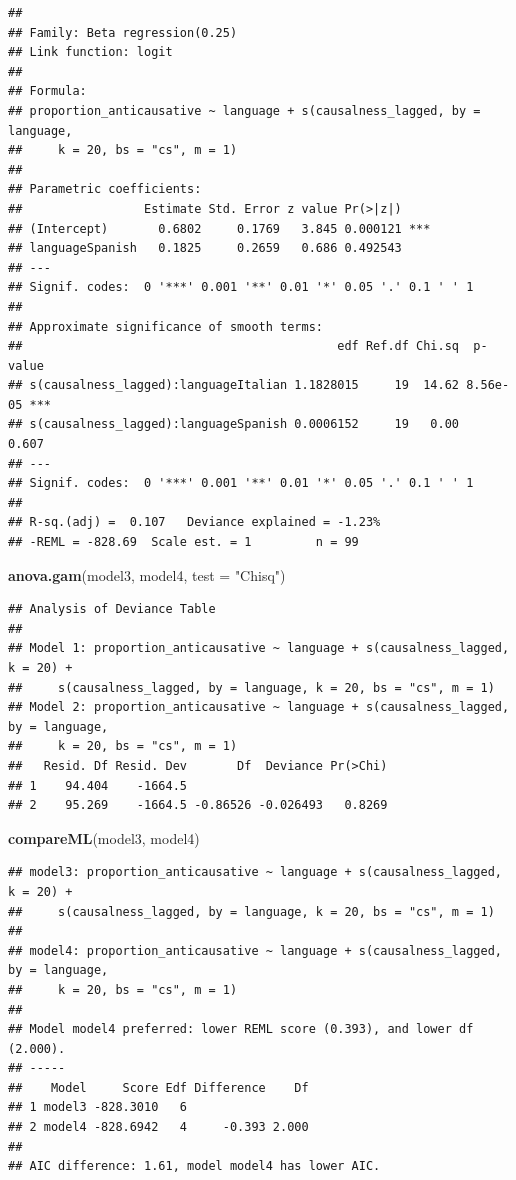 \documentclass[
]{article}
\newenvironment{Shaded}{\begin{snugshade}}{\end{snugshade}}
\newcommand{\AttributeTok}[1]{\textcolor[rgb]{0.13,0.29,0.53}{#1}}
\newcommand{\FunctionTok}[1]{\textcolor[rgb]{0.13,0.29,0.53}{\textbf{#1}}}
\newcommand{\NormalTok}[1]{#1}
\newcommand{\StringTok}[1]{\textcolor[rgb]{0.31,0.60,0.02}{#1}}
\begin{document}
\begin{verbatim}
## 
## Family: Beta regression(0.25) 
## Link function: logit 
## 
## Formula:
## proportion_anticausative ~ language + s(causalness_lagged, by = language, 
##     k = 20, bs = "cs", m = 1)
## 
## Parametric coefficients:
##                 Estimate Std. Error z value Pr(>|z|)    
## (Intercept)       0.6802     0.1769   3.845 0.000121 ***
## languageSpanish   0.1825     0.2659   0.686 0.492543    
## ---
## Signif. codes:  0 '***' 0.001 '**' 0.01 '*' 0.05 '.' 0.1 ' ' 1
## 
## Approximate significance of smooth terms:
##                                            edf Ref.df Chi.sq  p-value    
## s(causalness_lagged):languageItalian 1.1828015     19  14.62 8.56e-05 ***
## s(causalness_lagged):languageSpanish 0.0006152     19   0.00    0.607    
## ---
## Signif. codes:  0 '***' 0.001 '**' 0.01 '*' 0.05 '.' 0.1 ' ' 1
## 
## R-sq.(adj) =  0.107   Deviance explained = -1.23%
## -REML = -828.69  Scale est. = 1         n = 99
\end{verbatim}

\begin{Shaded}
\begin{Highlighting}[]
\FunctionTok{anova.gam}\NormalTok{(model3, model4, }\AttributeTok{test =} \StringTok{"Chisq"}\NormalTok{) }
\end{Highlighting}
\end{Shaded}

\begin{verbatim}
## Analysis of Deviance Table
## 
## Model 1: proportion_anticausative ~ language + s(causalness_lagged, k = 20) + 
##     s(causalness_lagged, by = language, k = 20, bs = "cs", m = 1)
## Model 2: proportion_anticausative ~ language + s(causalness_lagged, by = language, 
##     k = 20, bs = "cs", m = 1)
##   Resid. Df Resid. Dev       Df  Deviance Pr(>Chi)
## 1    94.404    -1664.5                            
## 2    95.269    -1664.5 -0.86526 -0.026493   0.8269
\end{verbatim}

\begin{Shaded}
\begin{Highlighting}[]
\FunctionTok{compareML}\NormalTok{(model3, model4)}
\end{Highlighting}
\end{Shaded}

\begin{verbatim}
## model3: proportion_anticausative ~ language + s(causalness_lagged, k = 20) + 
##     s(causalness_lagged, by = language, k = 20, bs = "cs", m = 1)
## 
## model4: proportion_anticausative ~ language + s(causalness_lagged, by = language, 
##     k = 20, bs = "cs", m = 1)
## 
## Model model4 preferred: lower REML score (0.393), and lower df (2.000).
## -----
##    Model     Score Edf Difference    Df
## 1 model3 -828.3010   6                 
## 2 model4 -828.6942   4     -0.393 2.000
## 
## AIC difference: 1.61, model model4 has lower AIC.
\end{verbatim}
\end{document}

